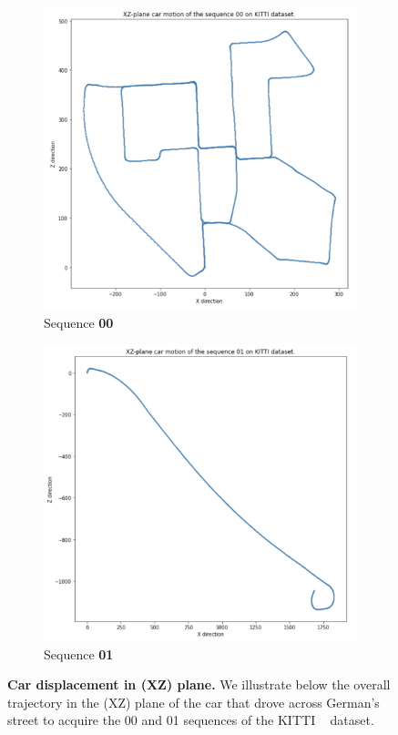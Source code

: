 \begin{figure}[htpb!]
    \centering
    \begin{subfigure}[b]{0.48\linewidth}
      \includegraphics[width=\linewidth]{images/epipolarnvs/XYplaneMotionKITTI.png}
      \caption{Sequence \textbf{00}}
    \end{subfigure}
    \quad %
    \begin{subfigure}[b]{0.48\linewidth}
      \includegraphics[width=\linewidth]{images/epipolarnvs/XYplaneMotionKITTI01.png}
      \caption{Sequence \textbf{01}}
    \end{subfigure}
    \caption{\textbf{Car displacement in (XZ) plane.} We illustrate below the overall trajectory in the (XZ) plane of the car that drove across German's street to acquire the 00 and 01 sequences of the KITTI ~\citep{geiger2012we} dataset.}
    \label{fig:test}
  \end{figure}

